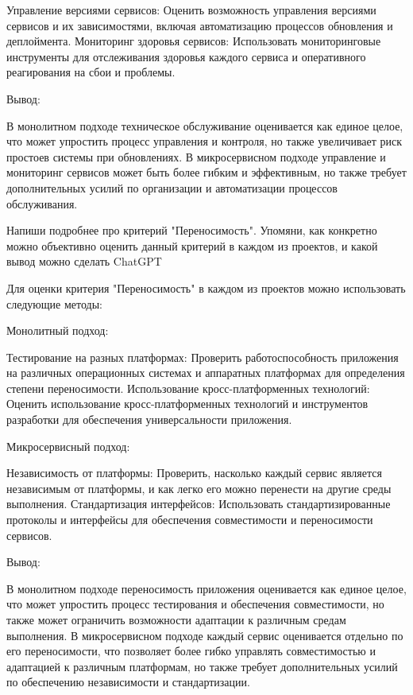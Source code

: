     Управление версиями сервисов: Оценить возможность управления версиями сервисов и их зависимостями, включая автоматизацию процессов обновления и деплоймента.
    Мониторинг здоровья сервисов: Использовать мониторинговые инструменты для отслеживания здоровья каждого сервиса и оперативного реагирования на сбои и проблемы.

Вывод:

    В монолитном подходе техническое обслуживание оценивается как единое целое, что может упростить процесс управления и контроля, но также увеличивает риск простоев системы при обновлениях.
    В микросервисном подходе управление и мониторинг сервисов может быть более гибким и эффективным, но также требует дополнительных усилий по организации и автоматизации процессов обслуживания.

Напиши подробнее про критерий "Переносимость". Упомяни, как конкретно можно объективно оценить данный критерий в каждом из проектов, и какой вывод можно сделать
ChatGPT

Для оценки критерия "Переносимость" в каждом из проектов можно использовать следующие методы:

Монолитный подход:

    Тестирование на разных платформах: Проверить работоспособность приложения на различных операционных системах и аппаратных платформах для определения степени переносимости.
    Использование кросс-платформенных технологий: Оценить использование кросс-платформенных технологий и инструментов разработки для обеспечения универсальности приложения.

Микросервисный подход:

    Независимость от платформы: Проверить, насколько каждый сервис является независимым от платформы, и как легко его можно перенести на другие среды выполнения.
    Стандартизация интерфейсов: Использовать стандартизированные протоколы и интерфейсы для обеспечения совместимости и переносимости сервисов.

Вывод:

    В монолитном подходе переносимость приложения оценивается как единое целое, что может упростить процесс тестирования и обеспечения совместимости, но также может ограничить возможности адаптации к различным средам выполнения.
    В микросервисном подходе каждый сервис оценивается отдельно по его переносимости, что позволяет более гибко управлять совместимостью и адаптацией к различным платформам, но также требует дополнительных усилий по обеспечению независимости и стандартизации.

